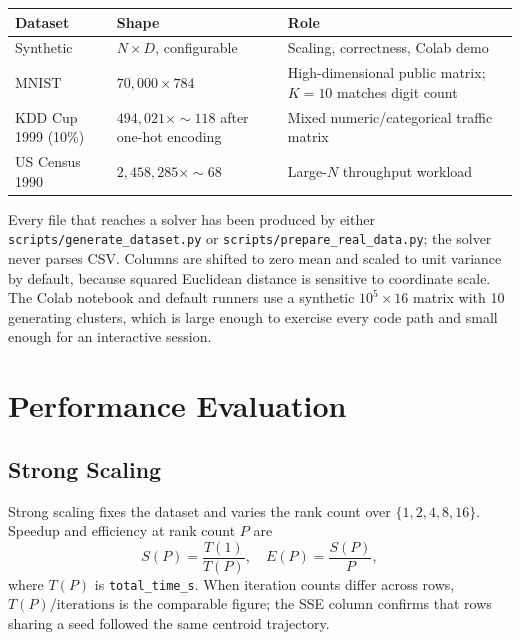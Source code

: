 \documentclass[12pt,a4paper]{article}
\DeclareRobustCommand{\code}[1]{\texttt{#1}}
\DeclareRobustCommand{\file}[1]{\texttt{#1}}
\begin{document}
\begin{center}
\renewcommand{\arraystretch}{1.18}
\begin{tabularx}{\textwidth}{@{}>{\raggedright\arraybackslash}p{1.5in}
                              >{\raggedright\arraybackslash}p{2.2in}
                              >{\raggedright\arraybackslash}X@{}}
\toprule
\textbf{Dataset} & \textbf{Shape} & \textbf{Role} \\
\midrule
Synthetic         & $N \times D$, configurable     & Scaling, correctness, Colab demo \\
MNIST \cite{lecun-mnist} & $70{,}000 \times 784$  & High-dimensional public matrix; $K=10$ matches digit count \\
KDD Cup 1999 (10\%) \cite{kddcup1999} & $494{,}021 \times {\sim}118$ after one-hot encoding & Mixed numeric/categorical traffic matrix \\
US Census 1990 \cite{census1990} & $2{,}458{,}285 \times {\sim}68$ & Large-$N$ throughput workload \\
\bottomrule
\end{tabularx}
\end{center}

Every file that reaches a solver has been produced by either \file{scripts/generate\_dataset.py} or \file{scripts/prepare\_real\_data.py}; the solver never parses CSV. Columns are shifted to zero mean and scaled to unit variance by default, because squared Euclidean distance is sensitive to coordinate scale. The Colab notebook and default runners use a synthetic $10^5 \times 16$ matrix with 10 generating clusters, which is large enough to exercise every code path and small enough for an interactive session.

\section{Performance Evaluation}
\label{sec:perf}

\subsection{Strong Scaling}

Strong scaling fixes the dataset and varies the rank count over $\{1, 2, 4, 8, 16\}$. Speedup and efficiency at rank count $P$ are
\begin{equation}
  S(P) = \frac{T(1)}{T(P)}, \quad E(P) = \frac{S(P)}{P},
  \label{eq:speedup}
\end{equation}
where $T(P)$ is \code{total\_time\_s}. When iteration counts differ across rows, $T(P)/\mathrm{iterations}$ is the comparable figure; the SSE column confirms that rows sharing a seed followed the same centroid trajectory.
\end{document}
